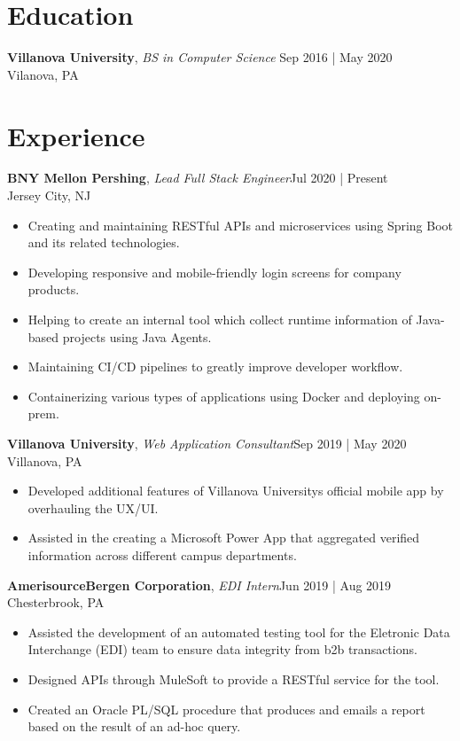 \documentclass[line,margin]{res}
\begin{document}
\address{allen.gueco1@gmail.com | Philadelphia, PA}
\begin{resume}
	\vspace{-5mm}
	        
	
	\section{Education}
	\textbf{Villanova University}, {\sl BS in Computer Science} \hfill Sep 2016 | May 2020\\Vilanova, PA
	\section{Experience}
	\textbf{BNY Mellon \textbar{} Pershing}, {\sl Lead Full Stack Engineer}\hfill Jul 2020 | Present\\Jersey City, NJ\\\begin{itemize} \itemsep 3pt
	\item Creating and maintaining RESTful APIs and microservices using Spring Boot and its related technologies.
	\item Developing responsive and mobile-friendly login screens for company products.
	\item Helping to create an internal tool which collect runtime information of Java-based projects using Java Agents.
	\item Maintaining CI/CD pipelines to greatly improve developer workflow.
	\item Containerizing various types of applications using Docker and deploying on-prem.
	\end{itemize}
	\textbf{Villanova University}, {\sl Web Application Consultant}\hfill Sep 2019 | May 2020\\Villanova, PA\\\begin{itemize} \itemsep 3pt
	\item Developed additional features of Villanova University\textquotesingle{}s official mobile app by overhauling the UX/UI.
	\item Assisted in the creating a Microsoft Power App that aggregated verified information across different campus departments.
	\end{itemize}
	\textbf{AmerisourceBergen Corporation}, {\sl EDI Intern}\hfill Jun 2019 | Aug 2019\\Chesterbrook, PA\\\begin{itemize} \itemsep 3pt
	\item Assisted the development of an automated testing tool for the Eletronic Data Interchange (EDI) team to ensure data integrity from b2b transactions.
	\item Designed APIs through MuleSoft to provide a RESTful service for the tool.
	\item Created an Oracle PL/SQL procedure that produces and emails a report based on the result of an ad-hoc query.
	\end{itemize}

\end{resume}
\end{document}
